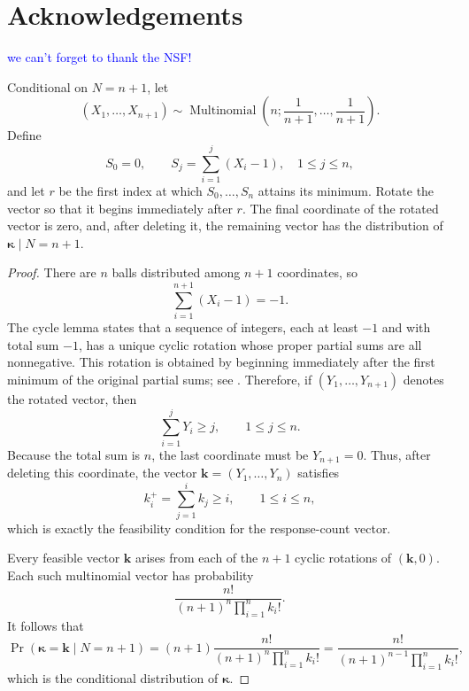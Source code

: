 \documentclass[opre,nonblindrev]{informs4}
\newcommand{\tb}{\textcolor{blue}}
\begin{document}
\section*{Acknowledgements} 


\tb{we can't forget to thank the NSF!}

\begin{proposition}
Conditional on $N=n+1$, let
\[
(X_1,\ldots,X_{n+1})
\sim
\operatorname{Multinomial}
\left(n;\frac{1}{n+1},\ldots,\frac{1}{n+1}\right).
\]
Define
\[
S_0=0,
\qquad
S_j=\sum_{i=1}^{j}(X_i-1),
\quad 1\leq j\leq n,
\]
and let $r$ be the first index at which $S_0,\ldots,S_n$
attains its minimum. Rotate the vector so that it begins immediately
after $r$. The final coordinate of the rotated vector is zero, and,
after deleting it, the remaining vector has the distribution of
$\boldsymbol{\kappa}\mid N=n+1$.
\end{proposition}

\begin{proof}
There are $n$ balls distributed among $n+1$ coordinates, so
\[
\sum_{i=1}^{n+1}(X_i-1)=-1.
\]
The cycle lemma states that a sequence of integers, each at least
$-1$ and with total sum $-1$, has a unique cyclic rotation whose
proper partial sums are all nonnegative. This rotation is obtained
by beginning immediately after the first minimum of the original
partial sums; see \cite[Corollary~14.4]{janson2012simply}. Therefore,
if $(Y_1,\ldots,Y_{n+1})$ denotes the rotated vector, then
\[
\sum_{i=1}^{j}Y_i\geq j,
\qquad 1\leq j\leq n.
\]
Because the total sum is $n$, the last coordinate must be $Y_{n+1}=0$.
Thus, after deleting this coordinate, the vector
$\mathbf{k}=(Y_1,\ldots,Y_n)$ satisfies
\[
k_i^+=\sum_{j=1}^{i}k_j\geq i,
\qquad 1\leq i\leq n,
\]
which is exactly the feasibility condition for the response-count
vector.

Every feasible vector $\mathbf{k}$ arises from each of the $n+1$
cyclic rotations of $(\mathbf{k},0)$. Each such multinomial vector
has probability
\[
\frac{n!}{(n+1)^n\prod_{i=1}^{n}k_i!}.
\]
It follows that
\[
\Pr(\boldsymbol{\kappa}=\mathbf{k}\mid N=n+1)
=
(n+1)\frac{n!}{(n+1)^n\prod_{i=1}^{n}k_i!}
=
\frac{n!}{(n+1)^{n-1}\prod_{i=1}^{n}k_i!},
\]
which is the conditional distribution of $\boldsymbol{\kappa}$.
\end{proof}

 
 





%
\end{document}
